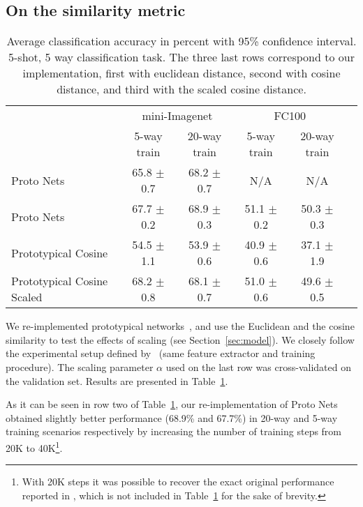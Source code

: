 \documentclass{article}
\begin{document}
\subsection{On the similarity metric}\label{ssec:cosine_distance}

\begin{table}[t]
    \centering
    \caption{Average classification accuracy in percent with 95\% confidence interval. 5-shot, 5 way classification task. The three last rows correspond to our implementation, first with euclidean distance, second with cosine distance, and third with the scaled cosine distance.}
    \label{table:cosine_vs_euclidian}
    \begin{tabular}{lccccr} 
        \toprule
         & \multicolumn{2}{c}{mini-Imagenet}  & \multicolumn{2}{c}{FC100} &  \\ 
         & 5-way train    &  20-way train   & 5-way train &  20-way train  \\ 
        \hline
        Proto Nets \cite{snell2017prototypical} & 65.8 $\pm$ 0.7 & 68.2 $\pm$ 0.7 & {N/A}  & {N/A} \\
        \hline
        Proto Nets & 67.7 $\pm$ 0.2 & 68.9 $\pm$ 0.3 & 51.1 $\pm$ 0.2  & 50.3 $\pm$ 0.3  \\
        Prototypical Cosine & 54.5 $\pm$ 1.1   & 53.9 $\pm$ 0.6   & 40.9 $\pm$ 0.6   & 37.1 $\pm$ 1.9 \\ 
        Prototypical Cosine Scaled &  68.2 $\pm$ 0.8  & 68.1 $\pm$ 0.7  & 51.0 $\pm$ 0.6  & 49.6 $\pm$ 0.5 \\  
        \bottomrule
    \end{tabular}
\end{table}

We re-implemented prototypical networks~\citep{snell2017prototypical}, and use the Euclidean and the cosine similarity to test the effects of scaling (see Section~\ref{sec:model}). We closely follow the experimental setup defined by~\citet{snell2017prototypical} (same feature extractor and training procedure). The scaling parameter $\alpha$ used on the last row was cross-validated on the validation set. Results are presented in Table~\ref{table:cosine_vs_euclidian}.

As it can be seen in row two of Table~\ref{table:cosine_vs_euclidian}, our re-implementation of Proto Nets \citep{snell2017prototypical} obtained slightly better performance (68.9\% and 67.7\%) in 20-way and 5-way training scenarios respectively by increasing the number of training steps from 20K to 40K\footnote{With 20K steps it was possible to recover the exact original performance reported in \citet{snell2017prototypical}, which is not included in Table~\ref{table:cosine_vs_euclidian} for the sake of brevity.}.
\end{document}

